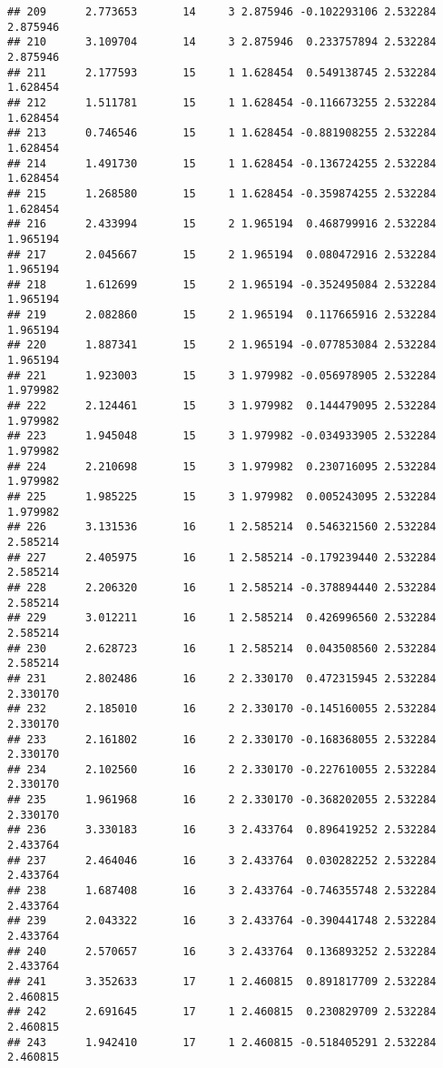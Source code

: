 \documentclass[]{book}
\theoremstyle{definition}
\theoremstyle{definition}
\theoremstyle{definition}
\theoremstyle{remark}
\begin{document}
\begin{verbatim}
## 209      2.773653       14     3 2.875946 -0.102293106 2.532284 2.875946
## 210      3.109704       14     3 2.875946  0.233757894 2.532284 2.875946
## 211      2.177593       15     1 1.628454  0.549138745 2.532284 1.628454
## 212      1.511781       15     1 1.628454 -0.116673255 2.532284 1.628454
## 213      0.746546       15     1 1.628454 -0.881908255 2.532284 1.628454
## 214      1.491730       15     1 1.628454 -0.136724255 2.532284 1.628454
## 215      1.268580       15     1 1.628454 -0.359874255 2.532284 1.628454
## 216      2.433994       15     2 1.965194  0.468799916 2.532284 1.965194
## 217      2.045667       15     2 1.965194  0.080472916 2.532284 1.965194
## 218      1.612699       15     2 1.965194 -0.352495084 2.532284 1.965194
## 219      2.082860       15     2 1.965194  0.117665916 2.532284 1.965194
## 220      1.887341       15     2 1.965194 -0.077853084 2.532284 1.965194
## 221      1.923003       15     3 1.979982 -0.056978905 2.532284 1.979982
## 222      2.124461       15     3 1.979982  0.144479095 2.532284 1.979982
## 223      1.945048       15     3 1.979982 -0.034933905 2.532284 1.979982
## 224      2.210698       15     3 1.979982  0.230716095 2.532284 1.979982
## 225      1.985225       15     3 1.979982  0.005243095 2.532284 1.979982
## 226      3.131536       16     1 2.585214  0.546321560 2.532284 2.585214
## 227      2.405975       16     1 2.585214 -0.179239440 2.532284 2.585214
## 228      2.206320       16     1 2.585214 -0.378894440 2.532284 2.585214
## 229      3.012211       16     1 2.585214  0.426996560 2.532284 2.585214
## 230      2.628723       16     1 2.585214  0.043508560 2.532284 2.585214
## 231      2.802486       16     2 2.330170  0.472315945 2.532284 2.330170
## 232      2.185010       16     2 2.330170 -0.145160055 2.532284 2.330170
## 233      2.161802       16     2 2.330170 -0.168368055 2.532284 2.330170
## 234      2.102560       16     2 2.330170 -0.227610055 2.532284 2.330170
## 235      1.961968       16     2 2.330170 -0.368202055 2.532284 2.330170
## 236      3.330183       16     3 2.433764  0.896419252 2.532284 2.433764
## 237      2.464046       16     3 2.433764  0.030282252 2.532284 2.433764
## 238      1.687408       16     3 2.433764 -0.746355748 2.532284 2.433764
## 239      2.043322       16     3 2.433764 -0.390441748 2.532284 2.433764
## 240      2.570657       16     3 2.433764  0.136893252 2.532284 2.433764
## 241      3.352633       17     1 2.460815  0.891817709 2.532284 2.460815
## 242      2.691645       17     1 2.460815  0.230829709 2.532284 2.460815
## 243      1.942410       17     1 2.460815 -0.518405291 2.532284 2.460815

\end{verbatim}
\end{document}

